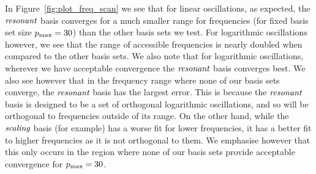     In Figure~\ref{fig:plot_freq_scan} we see that for linear oscillations, as expected,
    the $\textit{resonant}$ basis converges for a much smaller range for frequencies
    (for fixed basis set size $p_\text{max}=30$) than the other basis sets we test.
    For logarithmic oscillations however, we see that the range of accessible
    frequencies is nearly doubled when compared to the other basis sets.
    We also note that for logarithmic oscillations,
    wherever we have acceptable convergence the $\textit{resonant}$ basis converges best.
    We also see however that in the frequency range where none of our basis sets
    converge, the $\textit{resonant}$ basis has the largest error. This is because
    the $\textit{resonant}$ basis is designed to be a set of orthogonal logarithmic
    oscillations, and so will be orthogonal to frequencies outside of its range.
    On the other hand, while the $\textit{scaling}$ basis (for example) has
    a worse fit for lower frequencies, it has a better fit to higher frequencies as
    it is not orthogonal to them. We emphasise however that this only occurs
    in the region where none of our basis sets provide acceptable convergence
    for $p_\text{max}=30$.

